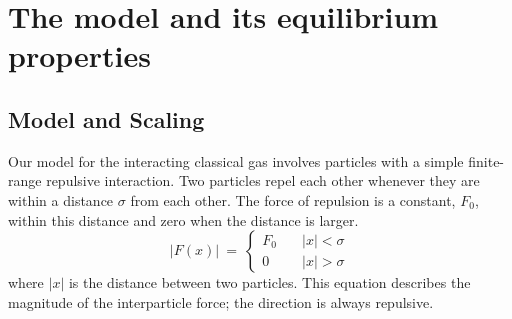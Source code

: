 \documentclass[a4paper, onecolumn]{revtex4-1}
\begin{document}




\section{The model and its equilibrium properties}\label{sec:preparation}

\subsection{Model and Scaling}

Our model for the interacting classical gas involves particles with a simple finite-range repulsive
interaction.  Two particles repel each other whenever they are within a distance $\sigma$ from each
other.  The force of repulsion is a constant, $F_0$, within this distance and zero when the distance
is larger. 
%
\begin{equation}
\Big| F(x) \Big| ~=~ \begin{cases}
F_0  &\quad |x|<\sigma\\
0  &\quad |x|>\sigma
\end{cases}
\label{eq:preparation1}
\end{equation}
where $|x|$ is the distance between two particles.  This equation describes the magnitude of the
interparticle force; the direction is always repulsive.
\end{document}

